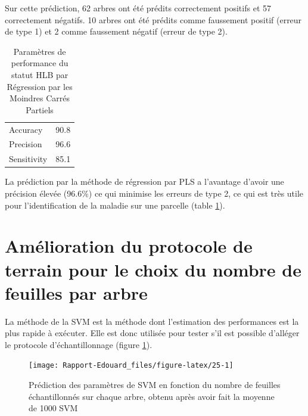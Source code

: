 \documentclass[
  11pt,
  french,
  a4paper,
  extrafontsizes,onecolumn,openright
  ]{memoir}
\begin{document}
\normalsize

Sur cette prédiction, 62 arbres ont été prédits correctement positifs et 57 correctement négatifs. 10 arbres ont été prédits comme faussement positif (erreur de type 1) et 2 comme faussement négatif (erreur de type 2).

\scriptsize

\begin{longtable}[t]{lr}
\caption{\label{tab:T4}Paramètres de performance du statut HLB par Régression par les Moindres Carrés Partiels}\\
\toprule
Accuracy & 90.8\\
Precision & 96.6\\
Sensitivity & 85.1\\
\bottomrule
\end{longtable}

\normalsize

La prédiction par la méthode de régression par PLS a l'avantage d'avoir une précision élevée (96.6\%) ce qui minimise les erreurs de type 2, ce qui est très utile pour l'identification de la maladie sur une parcelle (table \ref{tab:T4}).

\vfill
\newpage

\hypertarget{amuxe9lioration-du-protocole-de-terrain-pour-le-choix-du-nombre-de-feuilles-par-arbre}{%
\section{Amélioration du protocole de terrain pour le choix du nombre de feuilles par arbre}\label{amuxe9lioration-du-protocole-de-terrain-pour-le-choix-du-nombre-de-feuilles-par-arbre}}

La méthode de la SVM est la méthode dont l'estimation des performances est la plus rapide à exécuter. Elle est donc utilisée pour tester s'il est possible d'alléger le protocole d'échantillonnage (figure \ref{fig:25}).

\scriptsize

\begin{figure}

{\centering \texttt{[image: Rapport-Edouard\_files/figure-latex/25-1]} 

}

\caption{Prédiction des paramètres de SVM en fonction du nombre de feuilles échantillonnés sur chaque arbre, obtenu après avoir fait la moyenne de 1000 SVM}\label{fig:25}
\end{figure}

\normalsize
\end{document}
